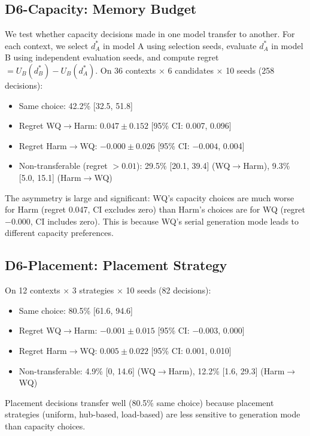 \documentclass[aps,prapplied,reprint,superscriptaddress]{revtex4-2}
\begin{document}
\subsection{D6-Capacity: Memory Budget}

We test whether capacity decisions made in one model transfer to another. For each context, we select $d_A^*$ in model A using selection seeds, evaluate $d_A^*$ in model B using independent evaluation seeds, and compute regret $= U_B(d_B^*) - U_B(d_A^*)$. On 36 contexts $\times$ 6 candidates $\times$ 10 seeds (258 decisions):

\begin{itemize}[leftmargin=2em]
\item Same choice: 42.2\% [32.5, 51.8]
\item Regret WQ$\to$Harm: $0.047 \pm 0.152$ [95\% CI: 0.007, 0.096]
\item Regret Harm$\to$WQ: $-0.000 \pm 0.026$ [95\% CI: $-0.004$, 0.004]
\item Non-transferable (regret $> 0.01$): 29.5\% [20.1, 39.4] (WQ$\to$Harm), 9.3\% [5.0, 15.1] (Harm$\to$WQ)
\end{itemize}

The asymmetry is large and significant: WQ's capacity choices are much worse for Harm (regret 0.047, CI excludes zero) than Harm's choices are for WQ (regret $-0.000$, CI includes zero). This is because WQ's serial generation mode leads to different capacity preferences.

\subsection{D6-Placement: Placement Strategy}

On 12 contexts $\times$ 3 strategies $\times$ 10 seeds (82 decisions):

\begin{itemize}[leftmargin=2em]
\item Same choice: 80.5\% [61.6, 94.6]
\item Regret WQ$\to$Harm: $-0.001 \pm 0.015$ [95\% CI: $-0.003$, 0.000]
\item Regret Harm$\to$WQ: $0.005 \pm 0.022$ [95\% CI: 0.001, 0.010]
\item Non-transferable: 4.9\% [0, 14.6] (WQ$\to$Harm), 12.2\% [1.6, 29.3] (Harm$\to$WQ)
\end{itemize}

Placement decisions transfer well (80.5\% same choice) because placement strategies (uniform, hub-based, load-based) are less sensitive to generation mode than capacity choices.
\end{document}
